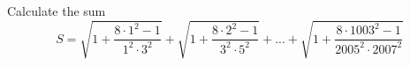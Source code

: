 Calculate the sum $$S=\sqrt{1+\frac{8\cdot 1^2-1}{1^2\cdot 3^2}}+\sqrt{1+\frac{8\cdot 2^2-1}{3^2\cdot 5^2}}+...+ \sqrt{1+\frac{8\cdot 1003^2-1}{2005^2\cdot 2007^2}}$$